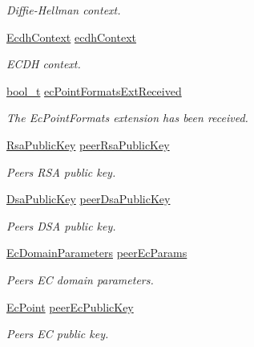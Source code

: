 \begin{DoxyCompactItemize}
\begin{DoxyCompactList}\small\item\em Diffie-\/\+Hellman context. \end{DoxyCompactList}\item 
\hyperlink{structEcdhContext}{Ecdh\+Context} \hyperlink{struct__TlsContext_ace51fc0b1f1a9adbe357d7b8e880d8c8}{ecdh\+Context}
\begin{DoxyCompactList}\small\item\em E\+C\+DH context. \end{DoxyCompactList}\item 
\hyperlink{compiler__port_8h_a812d16e5494522586b3784e55d479912}{bool\+\_\+t} \hyperlink{struct__TlsContext_a993d2fe15cd5b3a3da55bfbfc5a37f30}{ec\+Point\+Formats\+Ext\+Received}
\begin{DoxyCompactList}\small\item\em The Ec\+Point\+Formats extension has been received. \end{DoxyCompactList}\item 
\hyperlink{structRsaPublicKey}{Rsa\+Public\+Key} \hyperlink{struct__TlsContext_a7dad458ba0a1c14569c6bb4ed574afd8}{peer\+Rsa\+Public\+Key}
\begin{DoxyCompactList}\small\item\em Peer\textquotesingle{}s R\+SA public key. \end{DoxyCompactList}\item 
\hyperlink{structDsaPublicKey}{Dsa\+Public\+Key} \hyperlink{struct__TlsContext_a2b5974998c76bede5a7b7591c48be026}{peer\+Dsa\+Public\+Key}
\begin{DoxyCompactList}\small\item\em Peer\textquotesingle{}s D\+SA public key. \end{DoxyCompactList}\item 
\hyperlink{structEcDomainParameters}{Ec\+Domain\+Parameters} \hyperlink{struct__TlsContext_aff3cbb8a3096cf4f7fe175600b8187ec}{peer\+Ec\+Params}
\begin{DoxyCompactList}\small\item\em Peer\textquotesingle{}s EC domain parameters. \end{DoxyCompactList}\item 
\hyperlink{structEcPoint}{Ec\+Point} \hyperlink{struct__TlsContext_ac3d0697cbd6230af3fa8bd311bc46eb2}{peer\+Ec\+Public\+Key}
\begin{DoxyCompactList}\small\item\em Peer\textquotesingle{}s EC public key. \end{DoxyCompactList}\item 

\end{DoxyCompactItemize}
